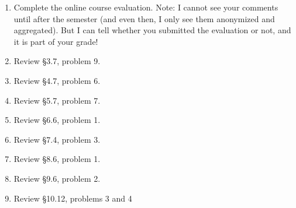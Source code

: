 \documentclass[12pt, leqno]{article}
\begin{document}

\begin{enumerate}
\item
  Complete the online course evaluation.  Note: I cannot see your
  comments until after the semester (and even then, I only see them
  anonymized and aggregated).  But I can tell whether you submitted
  the evaluation or not, and it is part of your grade!
\item Review \S 3.7, problem 9.
\item Review \S 4.7, problem 6.
\item Review \S 5.7, problem 7.
\item Review \S 6.6, problem 1.
\item Review \S 7.4, problem 3.
\item Review \S 8.6, problem 1.
\item Review \S 9.6, problem 2.
\item Review \S 10.12, problems 3 and 4
\end{enumerate}
\end{document}
